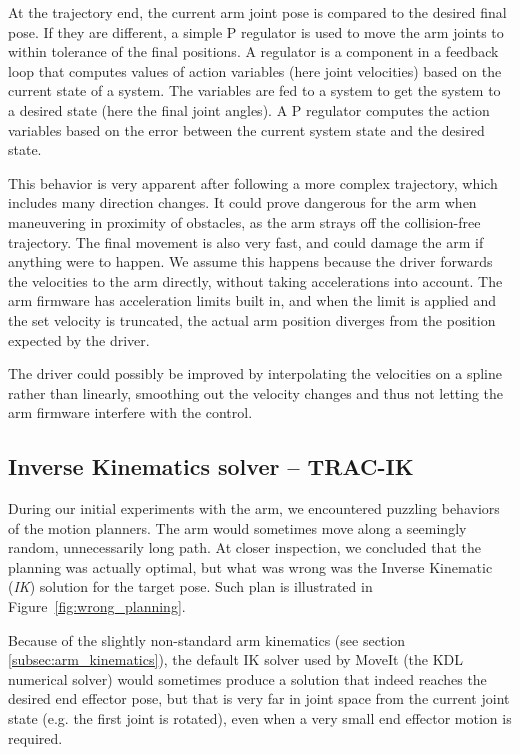 \documentclass[buriama8_dp.tex]{subfiles}
\begin{document}
At the trajectory end, the current arm joint pose is compared to the desired final pose. If they are different, a simple P regulator is used to move the arm joints to within tolerance of the final positions. A regulator is a component in a feedback loop that computes values of action variables (here joint velocities) based on the current state of a system. The variables are fed to a system to get the system to a desired state (here the final joint angles). A P regulator computes the action variables based on the error between the current system state and the desired state.

This behavior is very apparent after following a more complex trajectory, which includes many direction changes. It could prove dangerous for the arm when maneuvering in proximity of obstacles, as the arm strays off the collision-free trajectory. The final movement is also very fast, and could damage the arm if anything were to happen. We assume this happens because the driver forwards the velocities to the arm directly, without taking accelerations into account. The arm firmware has acceleration limits built in, and when the limit is applied and the set velocity is truncated, the actual arm position diverges from the position expected by the driver.

The driver could possibly be improved by interpolating the velocities on a spline rather than linearly, smoothing out the velocity changes and thus not letting the arm firmware interfere with the control.

\subsection{Inverse Kinematics solver -- TRAC-IK}
\label{subsec:tracik}

During our initial experiments with the arm, we encountered puzzling behaviors of the motion planners. The arm would sometimes move along a seemingly random, unnecessarily long path. At closer inspection, we concluded that the planning was actually optimal, but what was wrong was the Inverse Kinematic (\emph{IK}) solution for the target pose. Such plan is illustrated in Figure~\ref{fig:wrong_planning}.

Because of the slightly non-standard arm kinematics (see section \ref{subsec:arm_kinematics}), the default IK solver used by MoveIt (the KDL numerical solver) would sometimes produce a solution that indeed reaches the desired end effector pose, but that is very far in joint space from the current joint state (e.g. the first joint is rotated), even when a very small end effector motion is required.
\end{document}
